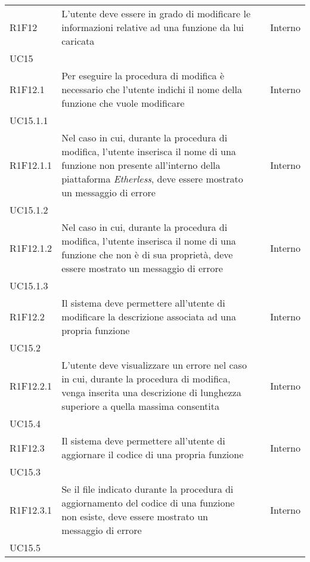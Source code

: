 \begin{longtable}{ 
		>{\centering}p{} 
		>{}p{} 
		>{\centering}p{}
		>{\centering}p{} }
	R1F12 & L'utente deve essere in grado di modificare le informazioni relative 
		ad una funzione da lui caricata 											& \ob & Interno \\ UC15 \tabularnewline
	R1F12.1 & Per eseguire la procedura di modifica è necessario che l'utente 
		indichi il nome della funzione che vuole modificare 						& \ob & Interno \\ UC15.1.1 \tabularnewline
	R1F12.1.1 & Nel caso in cui, durante la procedura di modifica, l'utente 
		inserisca il nome di una funzione non presente all'interno della piattaforma
		\textit{Etherless}, deve essere mostrato un messaggio di errore				& \ob & Interno \\ UC15.1.2 \tabularnewline
	R1F12.1.2 & Nel caso in cui, durante la procedura di modifica, l'utente 
		inserisca il nome di una funzione che non è di sua proprietà, deve essere 
		mostrato un messaggio di errore												& \ob & Interno \\ UC15.1.3 \tabularnewline
	R1F12.2 & Il sistema deve permettere all'utente di modificare la descrizione 
		associata ad una propria funzione 											& \ob & Interno \\ UC15.2 \tabularnewline
	R1F12.2.1 & L'utente deve visualizzare un errore nel caso in cui, durante 
		la procedura di modifica, venga inserita una descrizione di lunghezza
		superiore a quella massima consentita 										& \ob & Interno \\ UC15.4 \tabularnewline
	R1F12.3 & Il sistema deve permettere all'utente di aggiornare il codice di 
		una propria funzione 														& \ob & Interno \\ UC15.3 \tabularnewline	
	R1F12.3.1 & Se il file indicato durante la procedura di aggiornamento del 
		codice di una funzione non esiste, deve essere mostrato un messaggio di 
		errore																		& \ob & Interno \\ UC15.5 \tabularnewline
		

\end{longtable}
